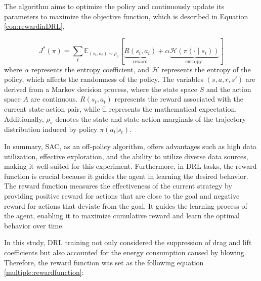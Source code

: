 \documentclass[%
 aip,
 amsmath,amssymb,
 reprint,%
]{revtex4-1}
\begin{document}
The algorithm aims to optimize the policy and continuously update its parameters to maximize the objective function, which is described in Equation \ref{con:rewardinDRL},

\begin{equation}
J^{*}(\pi)= \sum_{t} \mathbb{E}_{\left(s_{t}, a_{t}\right) \sim \rho_{\pi}} [\underbrace{R\left(s_{t}, a_{t}\right)}_{\text {reward}}+\alpha\underbrace{\mathcal{H}\left(\pi\left(\cdot \mid s_{t}\right)\right)}_{\text {entropy }}]
\label{con:rewardinDRL}
\end{equation}
where $\alpha$ represents the entropy coefficient, and $\mathcal{H}$ represents the entropy of the policy, which affects the randomness of the policy. The variables $(s, a, r, s')$ are derived from a Markov decision process, where the state space $S$ and the action space $A$ are continuous. $R(s_t, a_t)$ represents the reward associated with the current state-action pair, while $\mathbb{E}$ represents the mathematical expectation. Additionally, $\rho_\pi$ denotes the state and state-action marginals of the trajectory distribution induced by policy $\pi(a_t|s_t)$.

In summary, SAC, as an off-policy algorithm, offers advantages such as high data utilization, effective exploration, and the ability to utilize diverse data sources, making it well-suited for this experiment. Furthermore, in DRL tasks, the reward function is crucial because it guides the agent in learning the desired behavior. The reward function measures the effectiveness of the current strategy by providing positive reward for actions that are close to the goal and negative reward for actions that deviate from the goal. It guides the learning process of the agent, enabling it to maximize cumulative reward and learn the optimal behavior over time.

In this study, DRL training not only considered the suppression of drag and lift coefficients but also accounted for the energy consumption caused by blowing. Therefore, the reward function was set as the following equation \ref{multiple:rewardfunction}:
\end{document}
